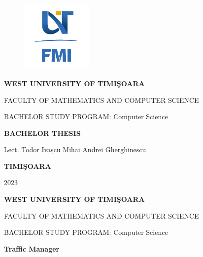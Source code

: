 \documentclass[17pt]{report}
\begin{document}
\thispagestyle{empty}
\begin{center}
\begin{figure}[h!]
\vspace{-20pt}
\begin{center}
\includegraphics[width=100pt]{FMI-03.png}
\end{center}
\end{figure}


{\large{\bf WEST UNIVERSITY OF TIMI\c SOARA

FACULTY OF MATHEMATICS AND COMPUTER SCIENCE

BACHELOR STUDY PROGRAM: Computer Science}}

\vspace{120pt}
{\huge {\bf BACHELOR THESIS}}

\vspace{160pt}
\end{center}

{\large{}

\noindent Lect. Todor Ivașcu \hfill 
\noindent Mihai Andrei Gherghinescu
}

\vfill
\begin{center}
{\bf TIMI\c SOARA

2023}
\end{center}
\newpage
\thispagestyle{empty}
\begin{center}
{\large{\bf WEST UNIVERSITY OF TIMI\c SOARA
		
FACULTY OF MATHEMATICS AND COMPUTER SCIENCE
		
BACHELOR STUDY PROGRAM:  Computer Science}}

\vspace{200pt}
{\huge {\bf Traffic Manager }}

\vspace{153pt}
\end{center}
\end{document}
